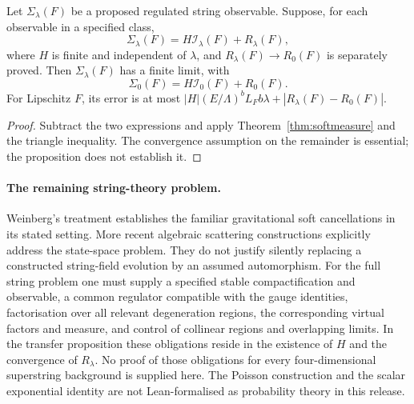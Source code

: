 \begin{proposition}
Let $\Sigma_\lambda(F)$ be a proposed regulated string observable. Suppose, for each observable in a specified class,
\[
\Sigma_\lambda(F)=H\mathcal I_\lambda(F)+R_\lambda(F),
\]
where $H$ is finite and independent of $\lambda$, and $R_\lambda(F)\to R_0(F)$ is separately proved. Then $\Sigma_\lambda(F)$ has a finite limit, with
\[
\Sigma_0(F)=H\mathcal I_0(F)+R_0(F).
\]
For Lipschitz $F$, its error is at most $|H|(E/\Lambda)^bL_Fb\lambda+|R_\lambda(F)-R_0(F)|$.
\end{proposition}
\begin{proof}
Subtract the two expressions and apply Theorem~\ref{thm:softmeasure} and the triangle inequality. The convergence assumption on the remainder is essential; the proposition does not establish it.
\end{proof}

\paragraph*{The remaining string-theory problem.} Weinberg's treatment \cite{Weinberg65} establishes the familiar gravitational soft cancellations in its stated setting. More recent algebraic scattering constructions \cite{PSW22,PS24} explicitly address the state-space problem. They do not justify silently replacing a constructed string-field evolution by an assumed automorphism. For the full string problem one must supply a specified stable compactification and observable, a common regulator compatible with the gauge identities, factorisation over all relevant degeneration regions, the corresponding virtual factors and measure, and control of collinear regions and overlapping limits. In the transfer proposition these obligations reside in the existence of $H$ and the convergence of $R_\lambda$. No proof of those obligations for every four-dimensional superstring background is supplied here. The Poisson construction and the scalar exponential identity are not Lean-formalised as probability theory in this release.
